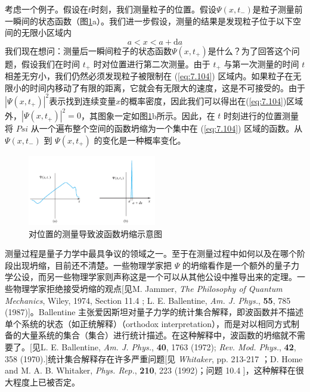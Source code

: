     考虑一个例子。假设在$t$时刻，我们测量粒子的位置。假设$\Psi\left(x,t_-\right)$是粒子测量前一瞬间的状态函数（图\ref{fig:7.6}a）。我们进一步假设，测量的结果是发现粒子位于以下空间的无限小区域内
    \begin{equation}
        a < x < a + \mathrm{d}a
        \label{eq:7.104}
    \end{equation}
    我们现在想问：测量后一瞬间粒子的状态函数$\Psi\left(x,t_+\right)$是什么？为了回答这个问题，假设我们在时间 $t_+$ 时对位置进行第二次测量。由于 $t_+$ 与第一次测量的时间 $t$ 相差无穷小，我们仍然必须发现粒子被限制在 (\ref{eq:7.104}) 区域内。如果粒子在无限小的时间内移动了有限的距离，它就会有无限大的速度，这是不可接受的。由于$\left|\Psi\left(x,t_+\right)\right|^2$表示找到连续变量$x$的概率密度，因此我们可以得出在(\ref{eq:7.104})区域外，$\left|\Psi\left(x,t_+\right)\right|^2=0$，其图象一定如图\ref{fig:7.6}b所示。因此，在 $t$ 时刻进行的位置测量将 $Psi$ 从一个遍布整个空间的函数坍缩为一个集中在 (\ref{eq:7.104}) 区域的函数。从$\Psi\left(x,t_-\right)$ 到 $\Psi\left(x,t_+\right)$ 的变化是一种概率变化。
    \begin{figure}[ht]
        \centering
        \includegraphics[width=0.5\textwidth]{Figures/7.6.png}
        \caption{对位置的测量导致波函数坍缩示意图}
        \label{fig:7.6}
    \end{figure}

    测量过程是量子力学中最具争议的领域之一。至于在测量过程中如何以及在哪个阶段出现坍缩，目前还不清楚。一些物理学家把 $\Psi$ 的坍缩看作是一个额外的量子力学公设，而另一些物理学家则声称这是一个可以从其他公设中推导出来的定理。一些物理学家拒绝接受坍缩的观点[见M. Jammer, \textit{The Philosophy of Quantum Mechanics}, Wiley, 1974, Section 11.4 ; L. E. Ballentine, \textit{Am. J. Phys.}, \textbf{55}, 785 (1987)]。Ballentine 主张爱因斯坦对量子力学的统计集合解释，即波函数并不描述单个系统的状态（如正统解释）（orthodox interpretation），而是对以相同方式制备的大量系统的集合（集合）进行统计描述。在这种解释中，波函数的坍缩就不需要了。[见L. E. Ballentine, \textit{Am. J. Phys.}, \textbf{40}, 1763 (1972); \textit{Rev. Mod. Phys.}, \textbf{42}, 358 (1970).]统计集合解释存在许多严重问题[见 \textit{Whitaker}, pp. 213-217 ；D. Home and M. A. B. Whitaker, \textit{Phys. Rep.}, \textbf{210}, 223 (1992)；问题 10.4 ]，这种解释在很大程度上已被否定。

